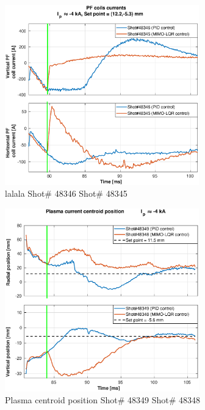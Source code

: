 \begin{figure}
	\centering
	\includegraphics[width=0.75\textwidth]{Chp5/PIDvsMIMO_346_345_curr_2.eps}
	\caption{lalala Shot\# 48346 Shot\# 48345}
\end{figure}

\begin{figure}
	\centering
	\includegraphics[width=0.75\textwidth]{Chp5/PIDvsMIMO_349_348_2.eps}
	\caption{Plasma centroid position Shot\# 48349 Shot\# 48348}
\end{figure}

